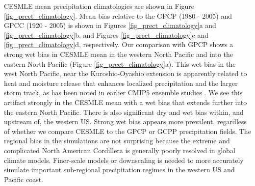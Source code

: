 \documentclass[final, double]{ua-thesis}
\begin{document}
CESMLE mean precipitation climatologies are shown in Figure \ref{fig_prect_climatology}. Mean bias relative to the GPCP (1980 - 2005) and GPCC (1920 - 2005) is shown in Figures \ref{fig_prect_climatology}a and \ref{fig_prect_climatology}b, and Figures \ref{fig_prect_climatology}c and \ref{fig_prect_climatology}d, respectively. Our comparison with GPCP shows a strong wet bias in CESMLE mean in the western North Pacific and into the eastern North Pacific (Figure \ref{fig_prect_climatology}a). This wet bias in the west North Pacific, near the Kuroshio-Oyashio extension is apparently related to heat and moisture release that enhances localized precipitation and the larger storm track, as has been noted in earlier CMIP5 ensemble studies \citep{3kwon_role_2010, 3choi_uncertainty_2016}. We see this artifact strongly in the CESMLE mean with a wet bias that extends further into the eastern North Pacific. There is also significant dry and wet bias within, and upstream of, the western US. Strong wet bias appears more prevalent, regardless of whether we compare CESMLE to the GPCP or GCPP precipitation fields. The regional bias in the simulations are not surprising because the extreme and complicated North American Cordillera is generally poorly resolved in global climate models. Finer-scale models or downscaling is needed to more accurately simulate important sub-regional precipitation regimes in the western US and Pacific coast.
% 
% 
\end{document}
